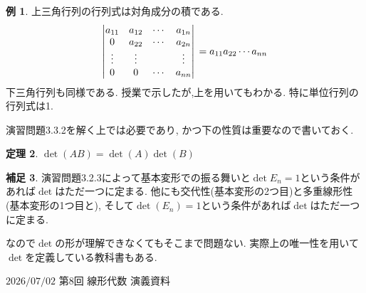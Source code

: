 \documentclass[dvipdfmx,a4paper,11pt]{article} %
\theoremstyle{definition}
\newtheorem{thm}{定理}
\newtheorem{rem}[thm]{補足}
\newtheorem{exa}[thm]{例}
\begin{document}
 \begin{exa}\cite[例 3.1.13]{O}
上三角行列の行列式は対角成分の積である.
$$
\begin{vmatrix}
a_{11} & a_{12} & \cdots & a_{1n} \\
0 & a_{22} & \cdots & a_{2n} \\
\vdots & \vdots & & \vdots \\
0& 0 & \cdots & a_{nn}
\end{vmatrix}\\
=a_{11}a_{22}\cdots a_{nn}
$$
下三角行列も同様である. 
授業で示したが,上を用いてもわかる. 
特に単位行列の行列式は1. 
\end{exa}


演習問題3.3.2を解く上では必要であり, かつ下の性質は重要なので書いておく.  
 
 \begin{thm}\cite[定理 3.3.4]{O}
$\det(AB)=\det(A) \det(B)$
\end{thm}

\begin{rem}
演習問題3.2.3によって基本変形での振る舞いと$\det E_n=1$という条件があれば$\det$はただ一つに定まる.
他にも交代性(基本変形の2つ目)と多重線形性(基本変形の1つ目と\cite[定理 3.2.1]{O}), そして$\det(E_n)=1$という条件があれば$\det$はただ一つに定まる.

なので$\det$の形が理解できなくてもそこまで問題ない. 実際上の唯一性を用いて$\det$を定義している教科書もある. 
\end{rem}







 \newpage
 $\boxed{\text{2026/07/02 第8回 線形代数 演義資料}}$
 
\end{document}
